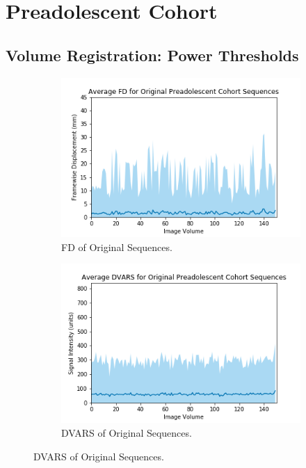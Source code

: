 \section{Preadolescent Cohort}

\subsection{Volume Registration: Power Thresholds}

\begin{figure}[]
	\centering
	\begin{subfigure}{0.4\textwidth}
		\centering
		\includegraphics[width=1.0\textwidth]{6/figures/preads-bold-fd-150.png}
		\caption{FD of Original Sequences.}
	\end{subfigure}
	\hspace{0.05\textwidth}
	\begin{subfigure}{0.4\textwidth}
		\centering
		\includegraphics[width=1.0\textwidth]{6/figures/preads-bold-dvars-150.png}
		\caption{DVARS of Original Sequences.}
	\end{subfigure}
	

\end{figure}
